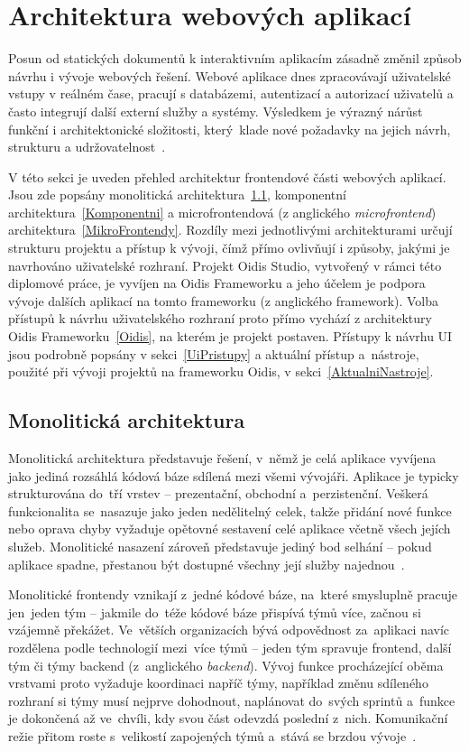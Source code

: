 \section{Architektura webových aplikací}
\label{Architektury}
Posun od statických dokumentů k interaktivním aplikacím zásadně změnil způsob návrhu i vývoje webových řešení. Webové aplikace dnes zpracovávají uživatelské vstupy v reálném čase, pracují s databázemi, autentizací a autorizací uživatelů a často integrují další externí služby a systémy. Výsledkem je výrazný nárůst funkční i architektonické složitosti, který~klade nové požadavky na jejich návrh, strukturu a udržovatelnost~\cite{WebApps}.

V této sekci je uveden přehled architektur frontendové části webových aplikací. Jsou zde popsány monolitická architektura~\ref{Monoliticka}, komponentní architektura~\ref{Komponentni} a microfrontendová (z anglického \textit{microfrontend}) architektura~\ref{MikroFrontendy}. Rozdíly mezi jednotlivými architekturami určují strukturu projektu a přístup k vývoji, čímž přímo ovlivňují i způsoby, jakými je navrhováno uživatelské rozhraní. Projekt Oidis Studio, vytvořený v rámci této diplomové práce, je vyvíjen na Oidis Frameworku a jeho účelem je podpora vývoje dalších aplikací na tomto frameworku (z anglického framework). Volba přístupů k návrhu uživatelského rozhraní proto přímo vychází z architektury Oidis Frameworku~\ref{Oidis}, na kterém je projekt postaven. Přístupy k návrhu UI jsou podrobně popsány v sekci~\ref{UiPristupy} a aktuální přístup a~nástroje, použité při vývoji projektů na frameworku Oidis, v sekci~\ref{AktualniNastroje}.

\subsection{Monolitická architektura}
\label{Monoliticka}
Monolitická architektura představuje řešení, v~němž je celá aplikace vyvíjena jako jediná rozsáhlá kódová báze sdílená mezi všemi vývojáři. Aplikace je typicky strukturována do~tří
vrstev -- prezentační, obchodní a~perzistenční. Veškerá funkcionalita se~nasazuje jako jeden nedělitelný celek, takže přidání nové funkce nebo oprava chyby vyžaduje opětovné sestavení celé aplikace včetně všech jejích služeb. Monolitické nasazení zároveň představuje jediný bod selhání -- pokud aplikace spadne, přestanou být dostupné všechny její služby najednou~\cite{Monolith}.

Monolitické frontendy vznikají z~jedné kódové báze, na~které
smysluplně pracuje jen~jeden tým -- jakmile do~téže kódové báze
přispívá týmů více, začnou si vzájemně překážet. Ve~větších organizacích bývá odpovědnost za~aplikaci navíc rozdělena
podle technologií mezi~více týmů -- jeden tým spravuje frontend,
další tým či týmy backend (z~anglického \textit{backend}). Vývoj funkce procházející oběma vrstvami proto vyžaduje koordinaci napříč týmy, například změnu sdíleného rozhraní si týmy musí nejprve dohodnout, naplánovat do~svých sprintů a~funkce je dokončená až ve~chvíli, kdy svou část odevzdá poslední z~nich. Komunikační režie přitom roste s~velikostí
zapojených týmů a~stává se brzdou vývoje~\cite{MicrofrontensGeers}.


